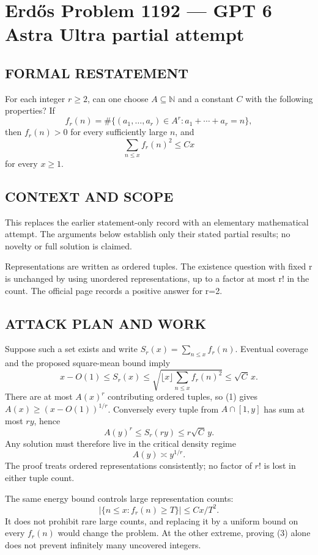 \section*{Erd\H{o}s Problem 1192 --- GPT 6 Astra Ultra partial attempt}


\subsection*{FORMAL RESTATEMENT}
For each integer $r\geq2$, can one choose $A\subseteq\mathbb N$ and a constant $C$ with the following properties? If
\[f_r(n)=\#\{(a_1,\ldots,a_r)\in A^r:a_1+\cdots+a_r=n\},\]
then $f_r(n)>0$ for every sufficiently large $n$, and
\[\sum_{n\leq x}f_r(n)^2\leq Cx\]
for every $x\geq1$.

\subsection*{CONTEXT AND SCOPE}
This replaces the earlier statement-only record with an elementary mathematical attempt. The arguments below establish only their stated partial results; no novelty or full solution is claimed.

Representations are written as ordered tuples. The existence question with fixed r is unchanged by using unordered representations, up to a factor at most r! in the count. The official page records a positive answer for r=2.

\subsection*{ATTACK PLAN AND WORK}
Suppose such a set exists and write $S_r(x)=\sum_{n\le x}f_r(n)$.
Eventual coverage and the proposed square-mean bound imply
\[x-O(1)\le S_r(x)\le\sqrt{\lfloor x\rfloor\sum_{n\le x}f_r(n)^2}
\le\sqrt C\,x.\tag{1}\]
There are at most $A(x)^r$ contributing ordered tuples, so (1) gives
$A(x)\ge(x-O(1))^{1/r}$. Conversely every tuple from $A\cap[1,y]$ has sum at
most $ry$, hence
\[A(y)^r\le S_r(ry)\le r\sqrt C\,y.\tag{2}\]
Any solution must therefore live in the critical density regime
\[A(y)\asymp y^{1/r}.\tag{3}\]
The proof treats ordered representations consistently; no factor of $r!$ is
lost in either tuple count.

The same energy bound controls large representation counts:
\[|\{n\le x:f_r(n)\ge T\}|\le Cx/T^2.\tag{4}\]
It does not prohibit rare large counts, and replacing it by a uniform bound
on every $f_r(n)$ would change the problem. At the other extreme, proving
(3) alone does not prevent infinitely many uncovered integers.

